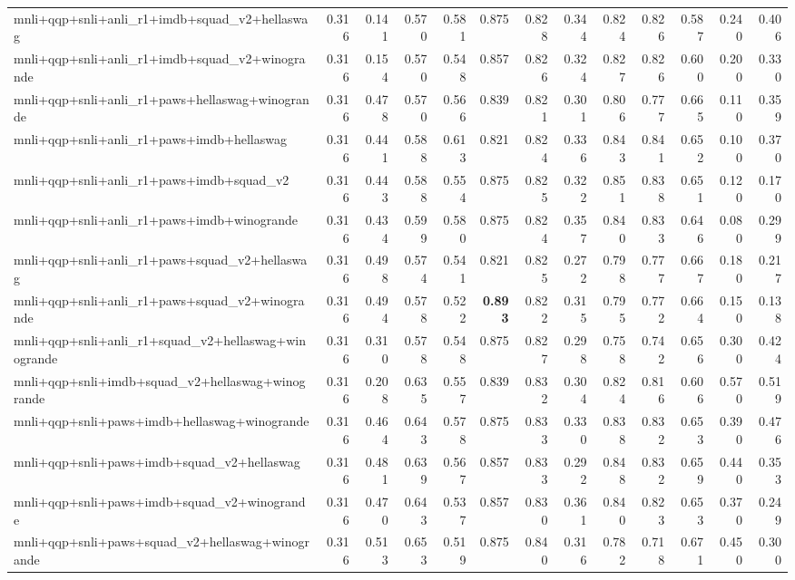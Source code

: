 \begin{table}[t]
\begin{tabular}{lrrrrrrrrrrrr}
    mnli+qqp+snli+anli\_r1+imdb+squad\_v2+hellaswag & 0.316 & 0.141 & 0.570 & 0.581 & 0.875 & 0.828 & 0.344 & 0.824 & 0.826 & 0.587 & 0.240 & 0.406 \\
    mnli+qqp+snli+anli\_r1+imdb+squad\_v2+winogrande & 0.316 & 0.154 & 0.570 & 0.548 & 0.857 & 0.826 & 0.324 & 0.827 & 0.826 & 0.600 & 0.200 & 0.330 \\
    mnli+qqp+snli+anli\_r1+paws+hellaswag+winogrande & 0.316 & 0.478 & 0.570 & 0.566 & 0.839 & 0.821 & 0.301 & 0.806 & 0.777 & 0.665 & 0.110 & 0.359 \\
    mnli+qqp+snli+anli\_r1+paws+imdb+hellaswag & 0.316 & 0.441 & 0.588 & 0.613 & 0.821 & 0.824 & 0.336 & 0.843 & 0.841 & 0.652 & 0.100 & 0.370 \\
    mnli+qqp+snli+anli\_r1+paws+imdb+squad\_v2 & 0.316 & 0.443 & 0.588 & 0.554 & 0.875 & 0.825 & 0.322 & 0.851 & 0.838 & 0.651 & 0.120 & 0.170 \\
    mnli+qqp+snli+anli\_r1+paws+imdb+winogrande & 0.316 & 0.434 & 0.599 & 0.580 & 0.875 & 0.824 & 0.357 & 0.840 & 0.833 & 0.646 & 0.080 & 0.299 \\
    mnli+qqp+snli+anli\_r1+paws+squad\_v2+hellaswag & 0.316 & 0.498 & 0.574 & 0.541 & 0.821 & 0.825 & 0.272 & 0.798 & 0.777 & 0.667 & 0.180 & 0.217 \\
    mnli+qqp+snli+anli\_r1+paws+squad\_v2+winogrande & 0.316 & 0.494 & 0.578 & 0.522 & \textbf{0.893} & 0.822 & 0.315 & 0.795 & 0.772 & 0.664 & 0.150 & 0.138 \\
    mnli+qqp+snli+anli\_r1+squad\_v2+hellaswag+winogrande & 0.316 & 0.310 & 0.578 & 0.548 & 0.875 & 0.827 & 0.298 & 0.758 & 0.742 & 0.656 & 0.300 & 0.424 \\
    mnli+qqp+snli+imdb+squad\_v2+hellaswag+winogrande & 0.316 & 0.208 & 0.635 & 0.557 & 0.839 & 0.832 & 0.304 & 0.824 & 0.816 & 0.606 & 0.570 & 0.519 \\
    mnli+qqp+snli+paws+imdb+hellaswag+winogrande & 0.316 & 0.464 & 0.643 & 0.578 & 0.875 & 0.833 & 0.330 & 0.838 & 0.832 & 0.653 & 0.390 & 0.476 \\
    mnli+qqp+snli+paws+imdb+squad\_v2+hellaswag & 0.316 & 0.481 & 0.639 & 0.567 & 0.857 & 0.833 & 0.292 & 0.848 & 0.832 & 0.659 & 0.440 & 0.353 \\
    mnli+qqp+snli+paws+imdb+squad\_v2+winogrande & 0.316 & 0.470 & 0.643 & 0.537 & 0.857 & 0.830 & 0.361 & 0.840 & 0.823 & 0.653 & 0.370 & 0.249 \\
    mnli+qqp+snli+paws+squad\_v2+hellaswag+winogrande & 0.316 & 0.513 & 0.653 & 0.519 & 0.875 & 0.840 & 0.316 & 0.782 & 0.718 & 0.671 & 0.450 & 0.300 \\

\end{tabular}
\end{table}
